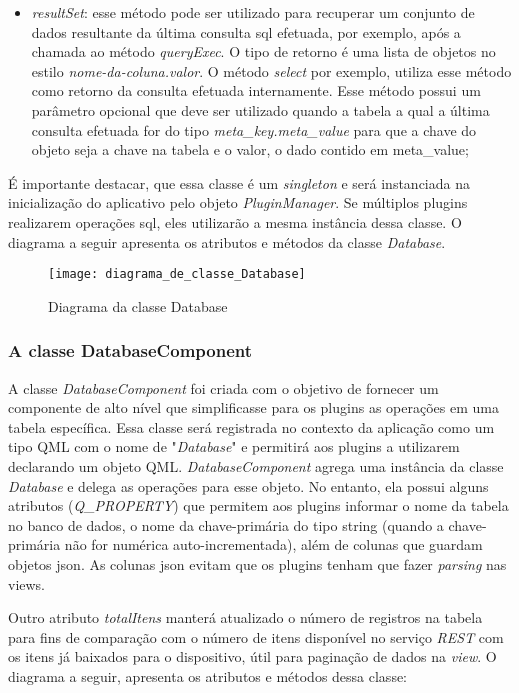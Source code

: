 \begin{itemize}
	\item \textit{resultSet}: esse método pode ser utilizado para recuperar um conjunto de dados resultante da última consulta sql efetuada, por exemplo, após a chamada ao método \textit{queryExec}. O tipo de retorno é uma lista de objetos no estilo \textit{nome-da-coluna.valor}. O método \textit{select} por exemplo, utiliza esse método como retorno da consulta efetuada internamente. Esse método possui um parâmetro opcional que deve ser utilizado quando a tabela a qual a última consulta efetuada for do tipo \textit{meta\_key.meta\_value} para que a chave do objeto seja a chave na tabela e o valor, o dado contido em meta\_value;
\end{itemize}

É importante destacar, que essa classe é um \textit{singleton} e será instanciada na inicialização do aplicativo pelo objeto \textit{PluginManager}. Se múltiplos plugins realizarem operações sql, eles utilizarão a mesma instância dessa classe. O diagrama a seguir apresenta os atributos e métodos da classe \textit{Database}.

\begin{figure}[h]
	\texttt{[image: diagrama\_de\_classe\_Database]}
	\centering
	\caption{Diagrama da classe Database}
\end{figure}

\subsubsection{A classe DatabaseComponent}\label{sec:solucao-desenvolvida}
A classe \textit{DatabaseComponent} foi criada com o objetivo de fornecer um componente de alto nível que simplificasse para os plugins as operações em uma tabela específica. Essa classe será registrada no contexto da aplicação como um tipo QML com o nome de "\textit{Database}" e permitirá aos plugins a utilizarem declarando um objeto QML. \textit{DatabaseComponent} agrega uma instância da classe \textit{Database} e delega as operações para esse objeto. No entanto, ela possui alguns atributos (\textit{Q\_PROPERTY}) que permitem aos plugins informar o nome da tabela no banco de dados, o nome da chave-primária do tipo string (quando a chave-primária não for numérica auto-incrementada), além de colunas que guardam objetos json. As colunas json evitam que os plugins tenham que fazer \textit{parsing} nas views.\par

Outro atributo \textit{totalItens} manterá atualizado o número de registros na tabela para fins de comparação com o número de itens disponível no serviço \textit{REST} com os itens já baixados para o dispositivo, útil para paginação de dados na \textit{view}. O diagrama a seguir, apresenta os atributos e métodos dessa classe:

